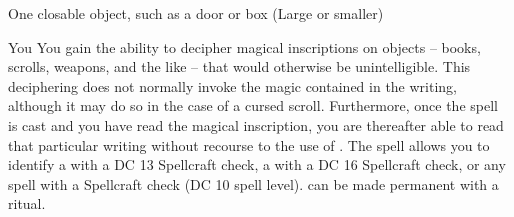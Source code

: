 \begin{spelltarget}{One closable object, such as a door or box (Large or smaller)}
\begin{spelltarget}{You}
\spelldur{\durlong}
\spelleffect You gain the ability to decipher magical inscriptions on objects -- books, scrolls, weapons, and the like -- that would otherwise be unintelligible. This deciphering does not normally invoke the magic contained in the writing, although it may do so in the case of a cursed scroll. Furthermore, once the spell is cast and you have read the magical inscription, you are thereafter able to read that particular writing without recourse to the use of . The spell allows you to identify a  with a DC 13 Spellcraft check, a  with a DC 16 Spellcraft check, or any  spell with a Spellcraft check (DC 10 \add spell level).
\spellnotes {} can be made permanent with a  ritual.


\end{spelltarget}
\end{spelltarget}
